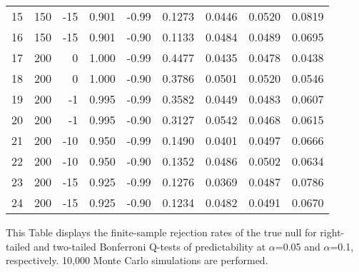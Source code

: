 \documentclass[11pt, a4paper]{article}
\begin{document}
\begin{table}[h!]
\begin{threeparttable}
\begin{tabular}{rrrrrrrrr}
  15 & 150 & -15 & 0.901 & -0.99 & 0.1273 & 0.0446 & 0.0520 & 0.0819 \\ 
  16 & 150 & -15 & 0.901 & -0.90 & 0.1133 & 0.0484 & 0.0489 & 0.0695 \\ 
  17 & 200 & 0 & 1.000 & -0.99 & 0.4477 & 0.0435 & 0.0478 & 0.0438 \\ 
  18 & 200 & 0 & 1.000 & -0.90 & 0.3786 & 0.0501 & 0.0520 & 0.0546 \\ 
  19 & 200 & -1 & 0.995 & -0.99 & 0.3582 & 0.0449 & 0.0483 & 0.0607 \\ 
  20 & 200 & -1 & 0.995 & -0.90 & 0.3127 & 0.0542 & 0.0468 & 0.0615 \\ 
  21 & 200 & -10 & 0.950 & -0.99 & 0.1490 & 0.0401 & 0.0497 & 0.0666 \\ 
  22 & 200 & -10 & 0.950 & -0.90 & 0.1352 & 0.0486 & 0.0502 & 0.0634 \\ 
  23 & 200 & -15 & 0.925 & -0.99 & 0.1276 & 0.0369 & 0.0487 & 0.0786 \\ 
  24 & 200 & -15 & 0.925 & -0.90 & 0.1234 & 0.0482 & 0.0491 & 0.0670 \\ 
   \hline
\end{tabular}
 \begin{tablenotes}
 \small
\item This Table displays the finite-sample rejection rates of the true null for right-tailed and two-tailed Bonferroni Q-tests of predictability at $\alpha$=0.05 and $\alpha$=0.1, respectively. 10,000 Monte Carlo simulations are performed.
\end{tablenotes}
\end{threeparttable}
\end{table}
\end{document}
